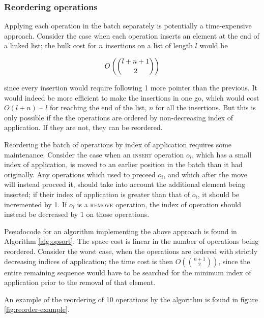 \subsubsection{Reordering operations}

Applying each operation in the batch separately is potentially a time-expensive
approach. Consider the case when each operation inserts an element at the end of
a linked list; the bulk cost for $n$ insertions on a list of length $l$ would be

$$O\left(\dbinom{l+n+1}{2}\right)$$

since every insertion would require following 1 more pointer than the previous.
It would indeed be more efficient to make the insertions in one go, which would
cost $O(l+n)$ -- $l$ for reaching the end of the list, $n$ for all the
insertions. But this is only possible if the the operations are ordered by
non-decreasing index of application. If they are not, they can be reordered.

Reordering the batch of operations by index of application requires some
maintenance. Consider the case when an \textsc{insert} operation $o_i$, which
has a small index of application, is moved to an earlier position in the batch
than it had originally. Any operations which used to preceed $o_i$, and which
after the move will instead proceed it, should take into account the additional
element being inserted; if their index of application is greater than that of
$o_i$, it should be incremented by 1. If $o_i$ is a \textsc{remove} operation,
the index of operation should instead be decreased by 1 on those operations.

Pseudocode for an algorithm implementing the above approach is found in
Algorithm \ref{alg:opsort}. The space cost is linear in the number of operations
being reordered. Consider the worst case, when the operations are ordered with
strictly decreasing indices of application; the time cost is then
$O\left(\binom{n+1}{2}\right)$, since the entire remaining sequence would have
to be searched for the minimum index of application prior to the removal of that
element.

An example of the reordering of 10 operations by the algorithm is found in
figure \ref{fig:reorder-example}.

